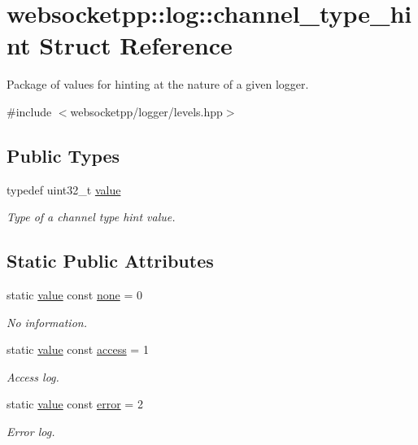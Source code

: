 \hypertarget{structwebsocketpp_1_1log_1_1channel__type__hint}{}\section{websocketpp\+:\+:log\+:\+:channel\+\_\+type\+\_\+hint Struct Reference}
\label{structwebsocketpp_1_1log_1_1channel__type__hint}


Package of values for hinting at the nature of a given logger.  




{\ttfamily \#include $<$websocketpp/logger/levels.\+hpp$>$}

\subsection*{Public Types}
\begin{DoxyCompactItemize}
\item 
typedef uint32\+\_\+t \hyperlink{structwebsocketpp_1_1log_1_1channel__type__hint_ad12a7f6555b71aabdc4cbec604dc89dd}{value}
\begin{DoxyCompactList}\small\item\em Type of a channel type hint value. \end{DoxyCompactList}\end{DoxyCompactItemize}
\subsection*{Static Public Attributes}
\begin{DoxyCompactItemize}
\item 
static \hyperlink{structwebsocketpp_1_1log_1_1channel__type__hint_ad12a7f6555b71aabdc4cbec604dc89dd}{value} const \hyperlink{structwebsocketpp_1_1log_1_1channel__type__hint_a2e7de3c97193085a20b7bb42815d23e2}{none} = 0
\begin{DoxyCompactList}\small\item\em No information. \end{DoxyCompactList}\item 
static \hyperlink{structwebsocketpp_1_1log_1_1channel__type__hint_ad12a7f6555b71aabdc4cbec604dc89dd}{value} const \hyperlink{structwebsocketpp_1_1log_1_1channel__type__hint_a8c38587fffbffbfcfc35577734b0d653}{access} = 1
\begin{DoxyCompactList}\small\item\em Access log. \end{DoxyCompactList}\item 
static \hyperlink{structwebsocketpp_1_1log_1_1channel__type__hint_ad12a7f6555b71aabdc4cbec604dc89dd}{value} const \hyperlink{structwebsocketpp_1_1log_1_1channel__type__hint_a91473ac49fba696549da438483a6fe31}{error} = 2
\begin{DoxyCompactList}\small\item\em Error log. \end{DoxyCompactList}\end{DoxyCompactItemize}


